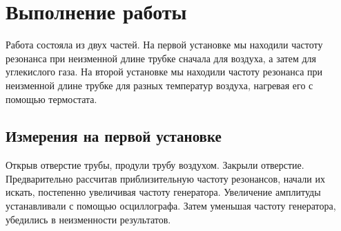 \documentclass[12pt]{article}
\begin{document}
		\clearpage
		\newpage
		\section*{Выполнение работы}
		Работа состояла из двух частей. На первой установке мы находили частоту резонанса при неизменной длине трубке сначала для воздуха, а затем для углекислого газа. На второй установке мы находили частоту резонанса при неизменной длине трубке для разных температур воздуха, нагревая его с помощью термостата.
		
		\subsection*{Измерения на первой установке}
		
		Открыв отверстие трубы, продули трубу воздухом. Закрыли отверстие. Предварительно рассчитав приблизительную частоту резонансов, начали их искать, постепенно увеличивая частоту генератора. Увеличение амплитуды устанавливали с помощью осциллографа. Затем уменьшая частоту генератора, убедились в неизменности результатов.
%		
		
\end{document}

